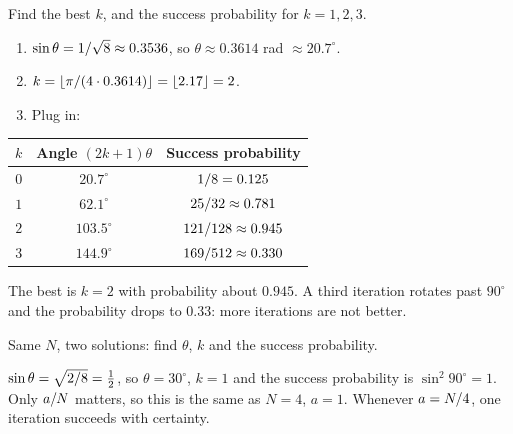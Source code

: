 \begin{exercisebox}
\begin{pproblem}[$N = 8$, $a = 1$, and overshooting]\label{pp:grover8}
    Find the best $k$, and the success probability for $k = 1, 2, 3$.
\end{pproblem}
\tcblower
\begin{wsolution}
    \leavevmode
    \begin{enumerate}
        \item $\sin\theta = 1/\sqrt{8} \approx 0.3536$, so
              $\theta \approx 0.3614$ rad $\approx 20.7^\circ$.
        \item $k = \floor{\sfrac{\pi}{(4 \cdot 0.3614)}} = \floor{2.17} = 2$.
        \item Plug in:
    \end{enumerate}
    \begin{center}
        \begin{tabular}{ccc}
            \toprule
            $k$ & Angle $(2k+1)\theta$ & Success probability                \\ \midrule
            $0$ & $20.7^\circ$         & $1/8 = 0.125$             \\
            $1$ & $62.1^\circ$         & $25/32 \approx 0.781$     \\
            $2$ & $103.5^\circ$        & $121/128 \approx 0.945$   \\
            $3$ & $144.9^\circ$        & $169/512 \approx 0.330$   \\ \bottomrule
        \end{tabular}
    \end{center}
    The best is $k = 2$ with probability about $0.945$. A third iteration rotates past $90^\circ$
    and the probability drops to $0.33$: more iterations are not better.
\end{wsolution}
\end{exercisebox}

\begin{exercisebox}
\begin{pproblem}[$N = 8$, $a = 2$]\label{pp:grover82}
    Same $N$, two solutions: find $\theta$, $k$ and the success probability.
\end{pproblem}
\tcblower
\begin{wsolution}
    $\sin\theta = \sqrt{2/8} = \frac{1}{2}$, so $\theta = 30^\circ$, $k = 1$ and the
    success probability is $\sin^2 90^\circ = 1$. Only $a/N$ matters, so this is the same as
    $N = 4$, $a = 1$. Whenever $a = N/4$, one iteration succeeds with certainty.
\end{wsolution}
\end{exercisebox}

